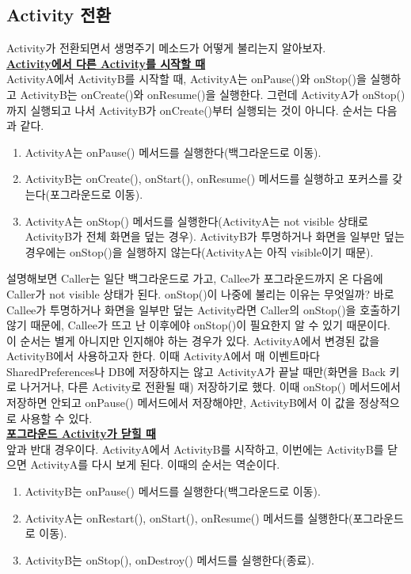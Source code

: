 \subsection{Activity 전환}
Activity가 전환되면서 생명주기 메소드가 어떻게 불리는지 알아보자.\\

\underline{\bfseries Activity에서 다른 Activity를 시작할 때}\\
ActivityA에서 ActivityB를 시작할 때, ActivityA는 onPause()와 onStop()을 실행하고
ActivityB는 onCreate()와 onResume()을 실행한다.
그런데 ActivityA가 onStop()까지 실행되고 나서 ActivityB가 onCreate()부터 실행되는 것이 아니다.
순서는 다음과 같다.
\begin{enumerate}
\item ActivityA는 onPause() 메서드를 실행한다(백그라운드로 이동).
\item ActivityB는 onCreate(), onStart(), onResume() 메서드를 실행하고 포커스를 갖는다(포그라운드로 이동).
\item ActivityA는 onStop() 메서드를 실행한다(ActivityA는 not visible 상태로 ActivityB가 전체 화면을 덮는 경우). ActivityB가 투명하거나 화면을 일부만 덮는 경우에는 onStop()을 실행하지 않는다(ActivityA는 아직 visible이기 때문).
\end{enumerate}

설명해보면 Caller는 일단 백그라운드로 가고, Callee가 포그라운드까지 온 다음에 Caller가 not visible 상태가 된다.
onStop()이 나중에 불리는 이유는 무엇일까? 
바로 Callee가 투명하거나 화면을 일부만 덮는 Activity라면 Caller의 onStop()을 호출하기 않기 때문에, 
Callee가 뜨고 난 이후에야 onStop()이 필요한지 알 수 있기 때문이다.\\

이 순서는 별게 아니지만 인지해야 하는 경우가 있다. 
ActivityA에서 변경된 값을 ActivityB에서 사용하고자 한다.
이때 ActivityA에서 매 이벤트마다 
SharedPreferences나 DB에 저장하지는 않고 ActivityA가 끝날 때만(화면을 Back 키로 나거거나, 다른 Activity로 전환될 때) 저장하기로 했다.
이때 onStop() 메서드에서 저장하면 안되고 onPause() 메서드에서 저장해야만, ActivityB에서 이 값을 정상적으로 사용할 수 있다.\\

\underline{\bfseries 포그라운드 Activity가 닫힐 때}\\
앞과 반대 경우이다. 
ActivityA에서 ActivityB를 시작하고, 이번에는 ActivityB를 닫으면 ActivityA를 다시 보게 된다.
이때의 순서는 역순이다.
\begin{enumerate}
\item ActivityB는 onPause() 메서드를 실행한다(백그라운드로 이동).
\item ActivityA는 onRestart(), onStart(), onResume() 메서드를 실행한다(포그라운드로 이동).
\item ActivityB는 onStop(), onDestroy() 메서드를 실행한다(종료).
\end{enumerate}



